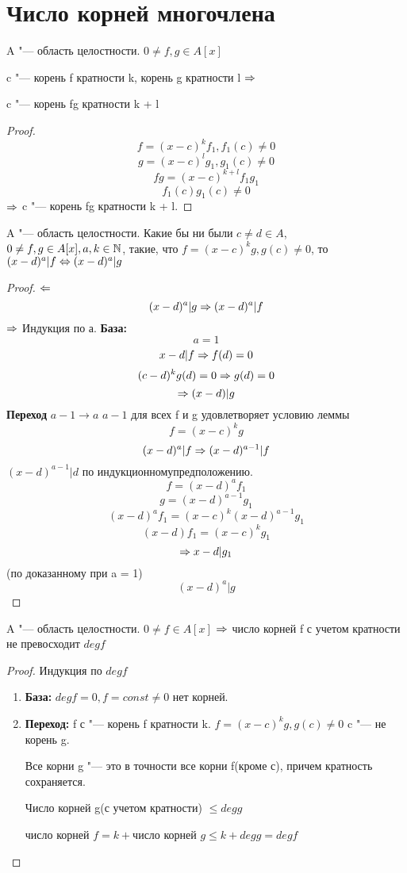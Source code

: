 ﻿\section{Число корней многочлена}
\begin{lemma}
A "--- область целостности. $0 \ne f, g \in A[x]$

c "--- корень f кратности k, корень g кратности l $\Rightarrow$

c "--- корень fg кратности k + l
\end{lemma}

\begin{proof}
$$f = (x - c)^kf_1, f_1(c) \ne 0$$
$$g = (x - c)^lg_1, g_1(c) \ne 0$$
$$fg = (x - c)^{k + l}f_1g_1$$
$$f_1(c)g_1(c) \ne 0$$
$\Rightarrow$ c "--- корень fg кратности k + l.
\end{proof}

\begin{lemma}
A "--- область целостности. 
Какие бы ни были $c \ne d \in A$, $0 \ne f, g \in A[x], a, k \in \mathbb{N}$, такие, что $f = (x - c)^{k}g, g(c) \ne 0$, то
$(x - d)^{a}|f \Leftrightarrow (x - d)^{a}|g$
\end{lemma}

\begin{proof}
$\Leftarrow$
$$ (x - d)^{a}|g \Rightarrow (x - d)^{a}|f$$
$\Rightarrow$
Индукция по а.
{\bf База:}
$$a = 1$$
$$x - d|f \Rightarrow f(d) = 0$$
$$(c - d)^kg(d) = 0 \Rightarrow g(d) = 0$$
$$\Rightarrow (x - d)|g$$
{\bf Переход} $a - 1 \to a$
$a - 1$ для всех f и g удовлетворяет условию леммы
$$f = (x - c)^{k}g$$
$$(x - d)^{a}|f \Rightarrow (x - d)^{a - 1}|f$$
$(x - d)^{a - 1}|d$ по индукционномупредположению.
$$f = (x - d)^{a}f_1$$
$$g = (x - d)^{a - 1}g_1$$
$$(x - d)^af_1 = (x - c)^{k}(x - d)^{a - 1}g_1$$
$$(x - d)f_1 = (x - c)^kg_1$$
$$\Rightarrow x - d|g_1$$
(по доказанному при a = 1)
$$(x - d)^{a}|g$$  
\end{proof}

\begin{theorem}{}
 A "--- область целостности. $0 \ne f \in A[x]$
 $\Rightarrow$ число корней f с учетом кратности не превосходит $deg f$
\end{theorem}
\begin{proof}
Индукция по $deg f$
\begin{enumerate}
\item {\bf База:} $deg f = 0, f = const \ne 0$
нет корней.
\item {\bf Переход:} f с "--- корень f кратности k.
$f = (x - c)^{k}g, g(c) \ne 0$ c "--- не корень g. 

Все корни g "--- это в точности все корни f(кроме с), причем кратность сохраняется. 

Число корней g(с учетом кратности) $\le deg g$

число корней $f = k + $число корней $g \le k + deg g = deg f$
\end{enumerate}

\end{proof}

